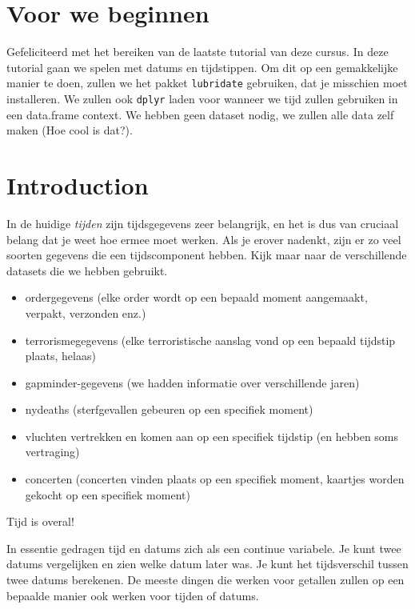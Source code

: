 \documentclass[]{tufte-book}
\providecommand{\tightlist}{%
  \setlength{\itemsep}{0pt}\setlength{\parskip}{0pt}}
\begin{document}
\hypertarget{voor-we-beginnen}{%
\section{Voor we beginnen}\label{voor-we-beginnen}}

Gefeliciteerd met het bereiken van de laatste tutorial van deze cursus. In deze tutorial gaan we spelen met datums en tijdstippen. Om dit op een gemakkelijke manier te doen, zullen we het pakket \texttt{lubridate} gebruiken, dat je misschien moet installeren. We zullen ook \texttt{dplyr} laden voor wanneer we tijd zullen gebruiken in een data.frame context. We hebben geen dataset nodig, we zullen alle data zelf maken (Hoe cool is dat?).

\hypertarget{introduction}{%
\section{Introduction}\label{introduction}}

In de huidige \emph{tijden} zijn tijdsgegevens zeer belangrijk, en het is dus van cruciaal belang dat je weet hoe ermee moet werken. Als je erover nadenkt, zijn er zo veel soorten gegevens die een tijdscomponent hebben. Kijk maar naar de verschillende datasets die we hebben gebruikt.

\begin{itemize}
\tightlist
\item
  ordergegevens (elke order wordt op een bepaald moment aangemaakt, verpakt, verzonden enz.)
\item
  terrorismegegevens (elke terroristische aanslag vond op een bepaald tijdstip plaats, helaas)
\item
  gapminder-gegevens (we hadden informatie over verschillende jaren)
\item
  nydeaths (sterfgevallen gebeuren op een specifiek moment)
\item
  vluchten vertrekken en komen aan op een specifiek tijdstip (en hebben soms vertraging)
\item
  concerten (concerten vinden plaats op een specifiek moment, kaartjes worden gekocht op een specifiek moment)
\end{itemize}

Tijd is overal!

In essentie gedragen tijd en datums zich als een continue variabele. Je kunt twee datums vergelijken en zien welke datum later was. Je kunt het tijdsverschil tussen twee datums berekenen. De meeste dingen die werken voor getallen zullen op een bepaalde manier ook werken voor tijden of datums.
\end{document}
